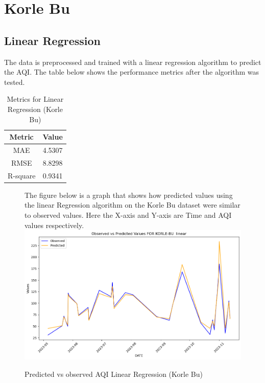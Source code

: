 \documentclass{book}
\numberwithin{equation}{section}
\numberwithin{figure}{section}
\begin{document}
\section{Korle Bu}
\label{korle bu}
\vspace{-5mm}
\subsection{Linear Regression}
\vspace{-5mm}
The data is preprocessed and trained with a linear regression algorithm to predict the AQI. The table below shows the performance metrics after the algorithm was tested.
\begin{table}[H]
    \centering
    \begin{tabular}{|c|c|}
        \hline
        \textbf{Metric} & \textbf{Value} \\
        \hline
        MAE & 4.5307 \\
        \hline
        RMSE & 8.8298 \\
        \hline
        R-square & 0.9341 \\
        \hline
    \end{tabular}
    \caption{Metrics for Linear Regression (Korle Bu)}
    \label{tab: Linear metrics(Korle Bu)}
\end{table}
\begin{figure}[H]
 \begin{minipage}{\linewidth}
        The figure below is a graph that shows how predicted values using the linear Regression algorithm on the Korle Bu dataset were similar to observed values. Here the X-axis and Y-axis are Time and AQI values respectively.
        \vspace{0.5em} 
        \includegraphics[width=\linewidth]{korle bu linear.png}
       
        \caption{ Predicted vs observed AQI Linear Regression (Korle Bu)}
        \label{fig: Linear predicted vs observed AQI(Korle Bu)}
    \end{minipage}
\end{figure}
\end{document}
